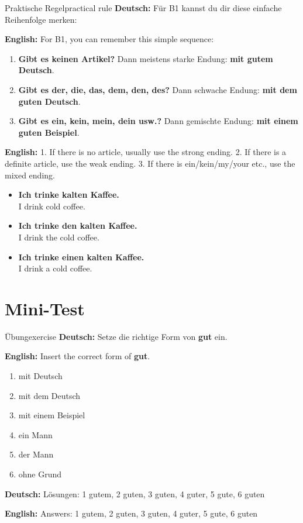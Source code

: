 \documentclass[a4paper,11pt]{article}
\newcommand{\GermanText}[1]{\textbf{Deutsch: }#1\par}
\newcommand{\EnglishText}[1]{{\small\color{SoftGray}\textbf{English: }#1\par}}
\newcommand{\ExampleItem}[2]{\item \textbf{#1}\\{\small\color{SoftGray}#2}}
\begin{document}
\begin{grammarentry}{Praktische Regel}{practical rule}
\GermanText{Für B1 kannst du dir diese einfache Reihenfolge merken:}
\EnglishText{For B1, you can remember this simple sequence:}

\begin{enumerate}
    \item \textbf{Gibt es keinen Artikel?} Dann meistens starke Endung: \textbf{mit gutem Deutsch}.
    \item \textbf{Gibt es der, die, das, dem, den, des?} Dann schwache Endung: \textbf{mit dem guten Deutsch}.
    \item \textbf{Gibt es ein, kein, mein, dein usw.?} Dann gemischte Endung: \textbf{mit einem guten Beispiel}.
\end{enumerate}

\EnglishText{1. If there is no article, usually use the strong ending. 2. If there is a definite article, use the weak ending. 3. If there is ein/kein/my/your etc., use the mixed ending.}

\begin{exbox}
\begin{itemize}
    \ExampleItem{Ich trinke kalten Kaffee.}{I drink cold coffee.}
    \ExampleItem{Ich trinke den kalten Kaffee.}{I drink the cold coffee.}
    \ExampleItem{Ich trinke einen kalten Kaffee.}{I drink a cold coffee.}
\end{itemize}
\end{exbox}
\end{grammarentry}

\section{Mini-Test}

\begin{grammarentry}{Übung}{exercise}
\GermanText{Setze die richtige Form von \textbf{gut} ein.}
\EnglishText{Insert the correct form of \textbf{gut}.}

\begin{enumerate}
    \item mit \underline{\hspace{2cm}} Deutsch
    \item mit dem \underline{\hspace{2cm}} Deutsch
    \item mit einem \underline{\hspace{2cm}} Beispiel
    \item ein \underline{\hspace{2cm}} Mann
    \item der \underline{\hspace{2cm}} Mann
    \item ohne \underline{\hspace{2cm}} Grund
\end{enumerate}

\GermanText{Lösungen: 1 gutem, 2 guten, 3 guten, 4 guter, 5 gute, 6 guten}
\EnglishText{Answers: 1 gutem, 2 guten, 3 guten, 4 guter, 5 gute, 6 guten}
\end{grammarentry}
\end{document}
